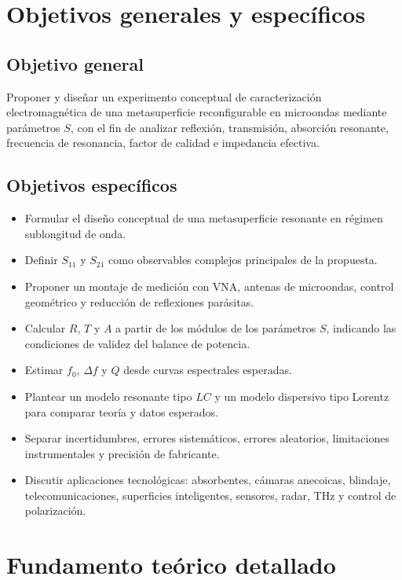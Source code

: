 \documentclass[12pt,a4paper]{article}
\begin{document}
\section{Objetivos generales y específicos}

\subsection*{Objetivo general}

Proponer y diseñar un experimento conceptual de caracterización electromagnética de una metasuperficie reconfigurable en microondas mediante parámetros \(S\), con el fin de analizar reflexión, transmisión, absorción resonante, frecuencia de resonancia, factor de calidad e impedancia efectiva.

\subsection*{Objetivos específicos}

\begin{itemize}
  \item Formular el diseño conceptual de una metasuperficie resonante en régimen sublongitud de onda.
  \item Definir \(S_{11}\) y \(S_{21}\) como observables complejos principales de la propuesta.
  \item Proponer un montaje de medición con VNA, antenas de microondas, control geométrico y reducción de reflexiones parásitas.
  \item Calcular \(R\), \(T\) y \(A\) a partir de los módulos de los parámetros \(S\), indicando las condiciones de validez del balance de potencia.
  \item Estimar \(f_0\), \(\Delta f\) y \(Q\) desde curvas espectrales esperadas.
  \item Plantear un modelo resonante tipo \(LC\) y un modelo dispersivo tipo Lorentz para comparar teoría y datos esperados.
  \item Separar incertidumbres, errores sistemáticos, errores aleatorios, limitaciones instrumentales y precisión de fabricante.
  \item Discutir aplicaciones tecnológicas: absorbentes, cámaras anecoicas, blindaje, telecomunicaciones, superficies inteligentes, sensores, radar, THz y control de polarización.
\end{itemize}

\section{Fundamento teórico detallado}
\end{document}
